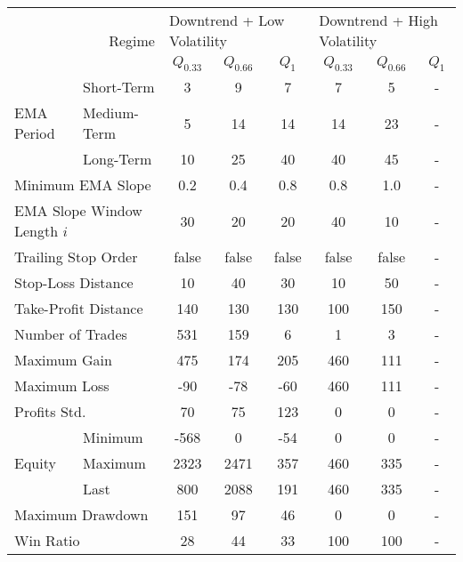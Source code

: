 \centering
\begin{tabular}{ll|cccccc}
    \toprule
    \multicolumn{2}{r|}{\multirow{2}{*}{Regime}} & \multicolumn{3}{l}{Downtrend + Low Volatility}   & \multicolumn{3}{l}{Downtrend + High Volatility}   \\
    \multicolumn{2}{r|}{} & $Q_{0.33}$ & $Q_{0.66}$ & $Q_{1}$ & $Q_{0.33}$ & $Q_{0.66}$ & $Q_{1}$ \\
    \midrule
    \multirow{3}{*}{EMA Period} & Short-Term  & 3    & 9    & 7   & 7   & 5   & - \\
    & Medium-Term & 5    & 14   & 14  & 14  & 23  & - \\
    & Long-Term   & 10   & 25   & 40  & 40  & 45  & - \\
    \multicolumn{2}{l|}{Minimum EMA Slope} & 0.2 & 0.4 & 0.8 & 0.8 & 1.0 & - \\
    \multicolumn{2}{l|}{EMA Slope Window Length $i$} & 30 & 20 & 20 & 40 & 10 & - \\
    \multicolumn{2}{l|}{Trailing Stop Order} & false & false & false & false & false & - \\
    \multicolumn{2}{l|}{Stop-Loss Distance} & 10 & 40 & 30 & 10 & 50 & - \\
    \multicolumn{2}{l|}{Take-Profit Distance} & 140 & 130 & 130 & 100 & 150 & - \\
    \midrule
    \multicolumn{2}{l|}{Number of Trades} & 531 & 159 & 6 & 1 & 3 & - \\
    \multicolumn{2}{l|}{Maximum Gain} & 475 & 174 & 205 & 460 & 111 & - \\
    \multicolumn{2}{l|}{Maximum Loss} & -90 & -78 & -60 & 460 & 111 & - \\
    \multicolumn{2}{l|}{Profits Std.} & 70 & 75 & 123 & 0 & 0 & - \\
    \multirow{3}{*}{Equity}     & Minimum     & -568 & 0    & -54 & 0   & 0   & - \\
    & Maximum     & 2323 & 2471 & 357 & 460 & 335 & - \\
    & Last        & 800  & 2088 & 191 & 460 & 335 & - \\
    \multicolumn{2}{l|}{Maximum Drawdown} & 151 & 97 & 46 & 0 & 0 & - \\
    \multicolumn{2}{l|}{Win Ratio} & 28 & 44 & 33 & 100 & 100 & - \\
    \bottomrule
\end{tabular}